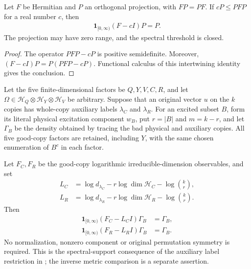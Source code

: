 \begin{lemma}
\label{lem:compressed-spectral-support}
\leanok
Let $F$ be Hermitian and $P$ an orthogonal projection, with $FP=PF$.
If $cP\le PFP$ for a real number $c$, then
\begin{align*}
 \mathbf1_{[0,\infty)}(F-cI)P=P.
\end{align*}
The projection may have zero range, and the spectral threshold is closed.
\end{lemma}

\begin{proof}\leanok
The operator $PFP-cP$ is positive semidefinite. Moreover,
$(F-cI)P=P(PFP-cP)$. Functional calculus of this intertwining identity
gives the conclusion.
\end{proof}

\begin{theorem}
\label{thm:replica-good-auxiliary-spectral-support}
\leanok
Let the five finite-dimensional factors be $Q,Y,V,C,R$, and let
$\Omega\in\mathcal H_Q\otimes\mathcal H_Y\otimes\mathcal H_V$ be arbitrary.
Suppose that an original vector $u$ on the $k$ copies has whole-copy auxiliary
labels $\lambda_C$ and $\lambda_R$. For an excited subset $B$, form its
literal physical excitation component $w_B$, put $r=|B|$ and $m=k-r$, and
let $\Gamma_B$ be the density obtained by tracing the bad physical and
auxiliary copies. All five good-copy factors are retained, including $Y$,
with the same chosen enumeration of $B^c$ in each factor.

Let $F_C,F_R$ be the good-copy logarithmic irreducible-dimension observables,
and set
\begin{align*}
 L_C&=\log d_{\lambda_C}-r\log\dim\mathcal H_C-\log\binom{k}{r},\\
 L_R&=\log d_{\lambda_R}-r\log\dim\mathcal H_R-\log\binom{k}{r}.
\end{align*}
Then
\begin{align*}
 \mathbf1_{[0,\infty)}(F_C-L_CI)\Gamma_B&=\Gamma_B,\\
 \mathbf1_{[0,\infty)}(F_R-L_RI)\Gamma_B&=\Gamma_B.
\end{align*}
No normalization, nonzero component or original permutation symmetry is
required. This is the spectral-support consequence of the auxiliary label
restriction in \cite[Section~7, equation \textup{(comparator:good-auxiliary)}]
{OpenAI2026AreaLaw}; the inverse metric comparison is a separate assertion.
\end{theorem}

